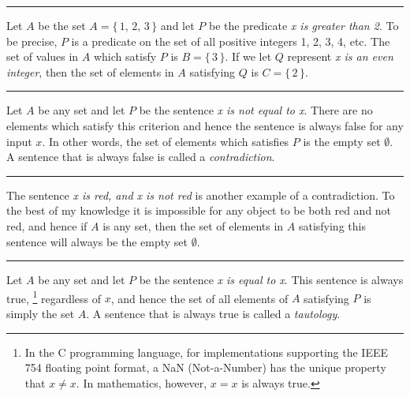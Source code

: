             \par\hfill\par\hrule
            \begin{example}
                Let $A$ be the set $A=\{\,1,\,2,\,3\,\}$ and let $P$ be the
                predicate \textit{x is greater than 2}. To be precise, $P$ is a
                predicate on the set of all positive integers 1, 2, 3, 4, etc.
                The set of values in $A$ which satisfy $P$ is $B=\{\,3\,\}$. If
                we let $Q$ represent \textit{x is an even integer}, then the
                set of elements in $A$ satisfying $Q$ is $C=\{\,2\,\}$.
            \end{example}
            \hrule
            \begin{example}
                Let $A$ be any set and let $P$ be the sentence
                \textit{x is not equal to x}. There are no elements which
                satisfy this criterion and hence the sentence is always false
                for any input $x$. In other words, the set of elements which
                satisfies $P$ is the empty set $\emptyset$. A sentence that is
                always false is called a
                \textit{contradiction}.
            \end{example}
            \hrule
            \begin{example}
                The sentence \textit{x is red, and x is not red} is another
                example of a contradiction. To the best of my knowledge it is
                impossible for any object to be both red and not red, and hence
                if $A$ is any set, then the set of elements in $A$ satisfying
                this sentence will always be the empty set $\emptyset$.
            \end{example}
            \hrule
            \begin{example}
                Let $A$ be any set and let $P$ be the sentence
                \textit{x is equal to x}. This sentence is always true,%
                \footnote{
                    In the C programming language, for implementations
                    supporting the IEEE 754 floating point format, a NaN
                    (Not-a-Number) has the unique property that $x\ne{x}$.
                    In mathematics, however, $x=x$ is always true.
                }
                regardless of $x$, and hence the set of all elements of $A$
                satisfying $P$ is simply the set $A$. A sentence that is always
                true is called a \textit{tautology}.
            \end{example}
